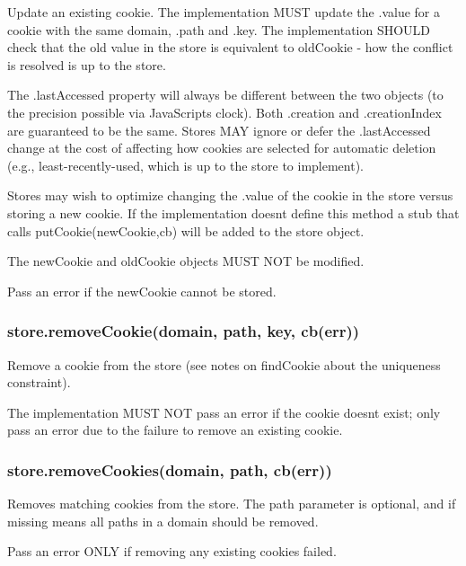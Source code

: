 Update an existing cookie. The implementation M\+U\+ST update the {\ttfamily .value} for a cookie with the same {\ttfamily domain}, {\ttfamily .path} and {\ttfamily .key}. The implementation S\+H\+O\+U\+LD check that the old value in the store is equivalent to {\ttfamily old\+Cookie} -\/ how the conflict is resolved is up to the store.

The {\ttfamily .last\+Accessed} property will always be different between the two objects (to the precision possible via Java\+Script\textquotesingle{}s clock). Both {\ttfamily .creation} and {\ttfamily .creation\+Index} are guaranteed to be the same. Stores M\+AY ignore or defer the {\ttfamily .last\+Accessed} change at the cost of affecting how cookies are selected for automatic deletion (e.\+g., least-\/recently-\/used, which is up to the store to implement).

Stores may wish to optimize changing the {\ttfamily .value} of the cookie in the store versus storing a new cookie. If the implementation doesn\textquotesingle{}t define this method a stub that calls {\ttfamily put\+Cookie(new\+Cookie,cb)} will be added to the store object.

The {\ttfamily new\+Cookie} and {\ttfamily old\+Cookie} objects M\+U\+ST N\+OT be modified.

Pass an error if the new\+Cookie cannot be stored.

\subsubsection*{{\ttfamily store.\+remove\+Cookie(domain, path, key, cb(err))}}

Remove a cookie from the store (see notes on {\ttfamily find\+Cookie} about the uniqueness constraint).

The implementation M\+U\+ST N\+OT pass an error if the cookie doesn\textquotesingle{}t exist; only pass an error due to the failure to remove an existing cookie.

\subsubsection*{{\ttfamily store.\+remove\+Cookies(domain, path, cb(err))}}

Removes matching cookies from the store. The {\ttfamily path} parameter is optional, and if missing means all paths in a domain should be removed.

Pass an error O\+N\+LY if removing any existing cookies failed.

